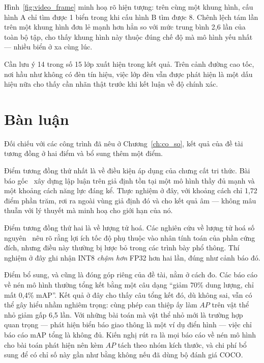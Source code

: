 Hình~\ref{fig:video_frame} minh hoạ rõ hiện tượng: trên cùng một khung hình, cấu hình A chỉ tìm
được 1 biển trong khi cấu hình B tìm được 8. Chênh lệch tám lần trên một khung hình đơn lẻ mạnh hơn
hẳn so với mức trung bình 2,6 lần của toàn bộ tập, cho thấy khung hình này thuộc đúng chế độ mà mô
hình yếu nhất --- nhiều biển ở xa cùng lúc.

Cần lưu ý 14 trong số 15 lớp xuất hiện trong kết quả. Trên cảnh đường cao tốc, nơi hầu như không có
đèn tín hiệu, việc lớp đèn vẫn được phát hiện là một dấu hiệu nữa cho thấy cần nhãn thật trước khi
kết luận về độ chính xác.

\section{Bàn luận}

Đối chiếu với các công trình đã nêu ở Chương~\ref{ch:co_so}, kết quả của đề tài tương đồng ở hai
điểm và bổ sung thêm một điểm.

Điểm tương đồng thứ nhất là về điều kiện áp dụng của chưng cất tri thức. Bài báo
gốc~\cite{hinton2015distillation} xây dựng lập luận trên giả định tồn tại một mô hình thầy đủ mạnh
và một khoảng cách năng lực đáng kể. Thực nghiệm ở đây, với khoảng cách chỉ 1,72 điểm phần trăm,
rơi ra ngoài vùng giả định đó và cho kết quả âm --- không mâu thuẫn với lý thuyết mà minh hoạ cho
giới hạn của nó.

Điểm tương đồng thứ hai là về lượng tử hoá. Các nghiên cứu về lượng tử hoá số
nguyên~\cite{jacob2018quantization} nêu rõ rằng lợi ích tốc độ phụ thuộc vào nhân tính toán của
phần cứng đích, nhưng điều này thường bị lược bỏ trong các trình bày phổ thông. Thí nghiệm ở đây
ghi nhận INT8 \emph{chậm hơn} FP32 hơn hai lần, đúng như cảnh báo đó.

Điểm bổ sung, và cũng là đóng góp riêng của đề tài, nằm ở cách đo. Các báo cáo về nén mô hình
thường tổng kết bằng một câu dạng ``giảm 70\% dung lượng, chỉ mất 0,4\% mAP''. Kết quả ở đây cho
thấy câu tổng kết đó, dù không sai, vẫn có thể gây hiểu nhầm nghiêm trọng: cùng phép can thiệp ấy
làm $AP$ trên vật thể nhỏ giảm gấp 6,5 lần. Với những bài toán mà vật thể nhỏ mới là trường hợp
quan trọng --- phát hiện biển báo giao thông là một ví dụ điển hình --- việc chỉ báo cáo mAP tổng là
không đủ. Kiến nghị rút ra là mọi báo cáo về nén mô hình cho bài toán phát hiện nên kèm $AP$ tách
theo nhóm kích thước, và chi phí bổ sung để có chỉ số này gần như bằng không nếu đã dùng bộ đánh
giá COCO.
